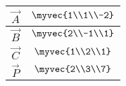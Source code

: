 \begin{tabular}{|c|c|}
\hline
$\vec{A}$ & $\myvec{1\\1\\-2}$\\
\hline
$\vec{B}$& $\myvec{2\\-1\\1}$\\
\hline
	$\vec{C}$ & $\myvec{1\\2\\1}$\\
	\hline
$\vec{P}$ & $\myvec{2\\3\\7}$\\
\hline
\end{tabular}
